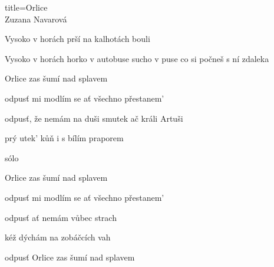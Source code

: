 \begin{song}{title=\centering Orlice \\\normalsize Zuzana Navarová  \vspace*{-0.3cm}}
{	Vysoko v horách prší na kalhotách bouli 
	
	Vysoko v horách horko v autobuse sucho v puse co si počneš s ní zdaleka 
	
\sloka
	Orlice zas šumí nad splavem 
	
	odpusť mi modlím se ať všechno přestanem' 
	
	odpusť, že nemám na duši smutek ač králi Artuši 
	
	prý utek' kůň i s bílím praporem 
	
sólo

\sloka
	Orlice zas šumí nad splavem 
	
	odpusť mi modlím se ať všechno přestanem' 
	
	odpusť ať nemám vůbec strach
	
	kéž dýchám na zobáčcích vah
	
	odpusť Orlice zas šumí nad splavem
	
}
\setcounter{Slokočet}{0}
\end{song}

